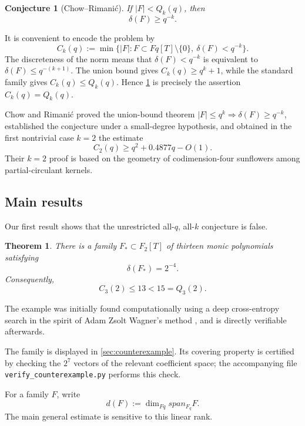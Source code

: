 \documentclass[11pt,reqno]{amsart}
\numberwithin{equation}{section}
\newtheorem{theorem}{Theorem}[section]
\newtheorem{conjecture}[conjecture]{Conjecture}
\theoremstyle{definition}
\theoremstyle{remark}
\newcommand{\spanq}{\operatorname{span}_{\mathbb F_q}}
\newcommand{\Fq}{\mathbb F_q}
\newcommand{\cF}{\mathcal F}
\newcommand{\abs}[1]{\lvert#1\rvert}
\newcommand{\set}[1]{\{#1\}}
\def\Fq{Fq}%
\def\mathbb#1{#1}%
\def\mathcal#1{#1}%
\def\operatorname#1{#1}%
\begin{document}
\begin{conjecture}[Chow--Rimani\'c]\label{conj:CR}
If $\abs{\cF}<Q_k(q)$, then
\[
 \delta(\cF)\ge q^{-k}.
\]
\end{conjecture}

It is convenient to encode the problem by
\begin{equation}\label{eq:Ck-def}
 C_k(q):=
 \min\set{
   \abs{\cF}:
   \cF\subset\Fq[T]\setminus\set{0},\
   \delta(\cF)<q^{-k}
 }.
\end{equation}
The discreteness of the norm means that
$\delta(\cF)<q^{-k}$ is equivalent to
$\delta(\cF)\le q^{-(k+1)}$.  The union bound gives
$C_k(q)\ge q^k+1$, while the standard family gives
$C_k(q)\le Q_k(q)$.  Hence \cref{conj:CR} is precisely the assertion
$C_k(q)=Q_k(q)$.

Chow and Rimani\'c proved the union-bound theorem
$\abs{\cF}\le q^k\Rightarrow\delta(\cF)\ge q^{-k}$, established the conjecture under a small-degree hypothesis, and obtained in the first nontrivial case $k=2$ the estimate
\begin{equation}\label{eq:CR-k2-intro}
 C_2(q)\ge q^2+0.4877q-O(1).
\end{equation}
Their $k=2$ proof is based on the geometry of codimension-four sunflowers among partial-circulant kernels.

\subsection{Main results}

Our first result shows that the unrestricted all-$q$, all-$k$ conjecture is false.

\begin{theorem}\label{thm:counterexample-intro}
There is a family $\cF_*\subset\mathbb F_2[T]$ of thirteen monic polynomials satisfying
\[
 \delta(\cF_*)=2^{-4}.
\]
Consequently,
\[
 C_3(2)\le13<15=Q_3(2).
\]
\end{theorem}

The example was initially found computationally using a deep cross-entropy search in the spirit of Adam Zsolt Wagner's method \cite{WagnerNeural}, and is directly verifiable afterwards.

The family is displayed in \cref{sec:counterexample}.  Its covering property is certified by checking the $2^7$ vectors of the relevant coefficient space; the accompanying file
\texttt{verify\_counterexample.py} performs this check.

For a family $\cF$, write
\[
 d(\cF):=\dim_{\Fq}\spanq\cF.
\]
The main general estimate is sensitive to this linear rank.
\end{document}
